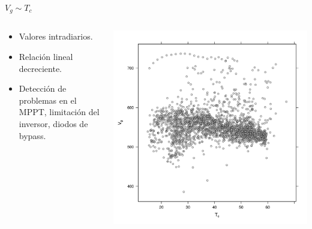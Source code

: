 \documentclass[aspectratio=169, usenames,svgnames,dvipsnames]{beamer}
\begin{document}
\begin{frame}[label={sec:org6117dae}]{\(V_g \sim T_c\)}
\begin{columns}
\begin{column}{0.3\columnwidth}
\begin{itemize}
\item Valores intradiarios.
\item Relación lineal decreciente.
\item Detección de problemas en el MPPT, limitación del inversor, diodos de bypass.
\end{itemize}
\end{column}

\begin{column}{0.7\columnwidth}
\begin{center}
\includegraphics[height=0.95\textheight]{../figs/VgTc.pdf}
\end{center}
\end{column}
\end{columns}
\end{frame}
\end{document}
